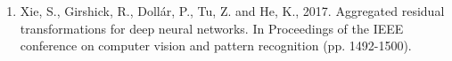 \documentclass{sciposter}
\begin{document}
\begin{multicols}{3}
\begin{enumerate}
\item Xie, S., Girshick, R., Dollár, P., Tu, Z. and He, K., 2017. Aggregated residual transformations for deep neural networks. In Proceedings of the IEEE conference on computer vision and pattern recognition (pp. 1492-1500).

\end{enumerate}


%







\end{multicols}
\end{document}
